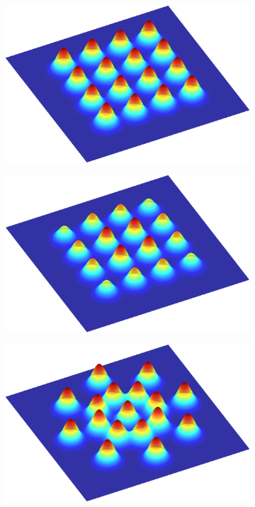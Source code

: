 \documentclass[thesis.tex]{subfiles}
\begin{document}
\begin{figure}[H]
    \centering
    \begin{subfigure}[t]{0.49\textwidth}
        \includegraphics[width=\textwidth]{img/cellLayoutSquare.png}
        \caption{}
        \label{fig:cellLayoutSquare}
    \end{subfigure}
	\begin{subfigure}[t]{0.49\textwidth}
        \includegraphics[width=\textwidth]{img/cellLayoutSquareCenter.png}
        \caption{}
        \label{fig:cellLayoutSquareCenter}
    \end{subfigure}
	\begin{subfigure}[t]{0.49\textwidth}
        \includegraphics[width=\textwidth]{img/cellLayoutPolar.png}

\end{subfigure}
\end{figure}
\end{document}
